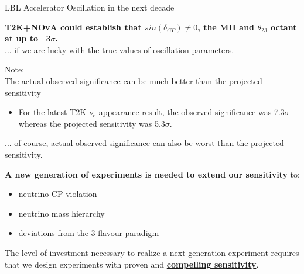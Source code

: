 \begin{frame}{LBL Accelerator Oscillation in the next decade}

{\scriptsize
{\bf T2K+NOvA could establish that $sin(\delta_{CP})\ne0$,
the MH and $\theta_{23}$ octant at up to ~3$\sigma$.}\\
\vspace{0.2cm}
{\color{red}... if we are lucky with the true values of oscillation parameters.}\\
\vspace{0.4cm}

Note:\\
The actual observed significance can be \underline{much better} than the projected sensitivity
\begin{itemize}
  \item For the latest T2K $\nu_{e}$ appearance result, the observed
        significance was 7.3$\sigma$ whereas the projected sensitivity was 5.3$\sigma$.\\
\end{itemize}
\vspace{0.2cm}
{\color{red}... of course, actual observed significance can also be worst than the projected sensitivity.}\\
\vspace{0.5cm}

{\bf A new generation of experiments is needed to extend our sensitivity} to:
\begin{itemize}
 \item neutrino CP violation
 \item neutrino mass hierarchy
 \item deviations from the 3-flavour paradigm
\end{itemize}
The level of investment necessary to realize a next generation experiment
requires that we design experiments with proven and {\bf \underline{compelling sensitivity}}.
}

\end{frame}



%
%
%
%


